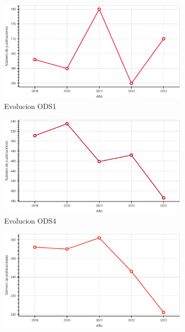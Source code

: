 \begin{figure}[H]
    \begin{subfigure}{0.45\textwidth}
        \includegraphics[width=0.9\linewidth]{imagenes/EvolucionOds1.eps} 
        \captionsetup{justification=centering}
        \caption{Evolucion ODS1}
        \label{fig:Evolucion ods1}
    \end{subfigure}
    \begin{subfigure}{0.45\textwidth}
        \includegraphics[width=0.9\linewidth]{imagenes/EvolucionOds4.eps} 
        \captionsetup{justification=centering}
        \caption{Evolucion ODS4}
        \label{fig:Evolucion ods4}
    \end{subfigure}
        \begin{subfigure}{0.45\textwidth}
        \includegraphics[width=0.9\linewidth]{imagenes/EvolucionOds5.eps} 

\end{subfigure}
\end{figure}
